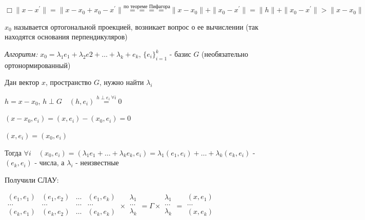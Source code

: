 \documentclass[12pt]{article}
\begin{document}
    $\Box \|x - x^\prime\| = \|x - x_0 + x_0 - x^\prime\| \stackrel{\text{по теореме Пифагора}}{====} \|x - x_0\| + \|x_0 - x^\prime\| = \|h\| + \|x_0 - x^\prime\| > \|x - x_0\|$

    \Nota $x_0$ называется ортогональной проекцией, возникает вопрос о ее вычислении (так находятся основания перпендикуляров)

    \vspace{5mm}

    \textit{Алгоритм:} $x_0 = \lambda_1 e_1 + \lambda_2 e2 + \dots + \lambda_k + e_k$, $\{e_i\}^k_{i=1}$ - базис $G$ (необязательно ортонормированный)

    Дан вектор $x$, пространство $G$, нужно найти $\lambda_i$

    $h = x - x_0$, $h \perp G \quad  (h, e_i) \stackrel{h \perp e_i \ \forall i}{=} 0$

    $(x - x_0, e_i) = (x, e_i) - (x_0, e_i) = 0$

    $(x, e_i) = (x_0, e_i)$

    Тогда $\forall i \quad (x_0, e_i) = (\lambda_1 e_1 + \dots + \lambda_k e_k, e_i) = \lambda_1 (e_1, e_i) + \dots + \lambda_k (e_k, e_i)$ - $(e_k, e_i)$ - числа, а $\lambda_i$ - неизвестные

    Получили СЛАУ:

    $\begin{array}{|cccc|}
    (e_1, e_1) & (e_1, e_2) & \ldots & (e_1, e_k)\\
    \ldots & \ldots & \ldots & \ldots\\
    (e_k, e_1) & (e_k, e_2) & \ldots & (e_k, e_k)\\
    \end{array} \times \begin{array}{|c|}
    \lambda_1\\
    \ldots\\
    \lambda_k \\
    \end{array} = \Gamma \times \begin{array}{|c|}
    \lambda_1\\
    \ldots\\
    \lambda_k \\
    \end{array} = \begin{array}{|c|}
    (x,e_1)\\
    \ldots\\
    (x,e_k) \\
    \end{array}$
\end{document}
